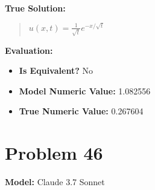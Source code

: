 \documentclass{article}
\begin{document}
\textbf{True Solution:}
\begin{quote}
$u(x,t) = \frac{1}{\sqrt{t}} e^{-x/\sqrt{t}}$
\end{quote}

\textbf{Evaluation:}
\begin{itemize}
\item \textbf{Is Equivalent?} No
\item \textbf{Model Numeric Value:} 1.082556
\item \textbf{True Numeric Value:} 0.267604
\end{itemize}
\vspace{1cm}
\section*{Problem 46}
\textbf{Model:} Claude 3.7 Sonnet
\end{document}
